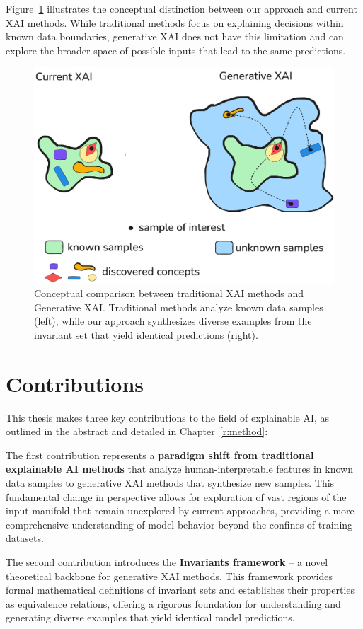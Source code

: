 \documentclass[licencjacka,en]{pracamgr}
\newcommand{\framework}[1]{Invariants}  %
\begin{document}
Figure~\ref{fig:1_teaser} illustrates the conceptual distinction between our approach and current XAI methods. While traditional methods focus on explaining decisions within known data boundaries, generative XAI does not have this limitation and can explore the broader space of possible inputs that lead to the same predictions.

\begin{figure}[h]
\centering
\includegraphics[width=0.8\linewidth]{figures/main/teaser1.png}
\caption{Conceptual comparison between traditional XAI methods and Generative XAI. Traditional methods analyze known data samples (left), while our approach synthesizes diverse examples from the invariant set that yield identical predictions (right).}
\label{fig:1_teaser}
\end{figure}

\section{Contributions}

This thesis makes three key contributions to the field of explainable AI, as outlined in the abstract and detailed in Chapter~\ref{r:method}:

The first contribution represents a \textbf{paradigm shift from traditional explainable AI methods} that analyze human-interpretable features in known data samples to generative XAI methods that synthesize new samples. This fundamental change in perspective allows for exploration of vast regions of the input manifold that remain unexplored by current approaches, providing a more comprehensive understanding of model behavior beyond the confines of training datasets.

The second contribution introduces the \textbf{\framework{} framework} -- a novel theoretical backbone for generative XAI methods. This framework provides formal mathematical definitions of invariant sets and establishes their properties as equivalence relations, offering a rigorous foundation for understanding and generating diverse examples that yield identical model predictions.
\end{document}
